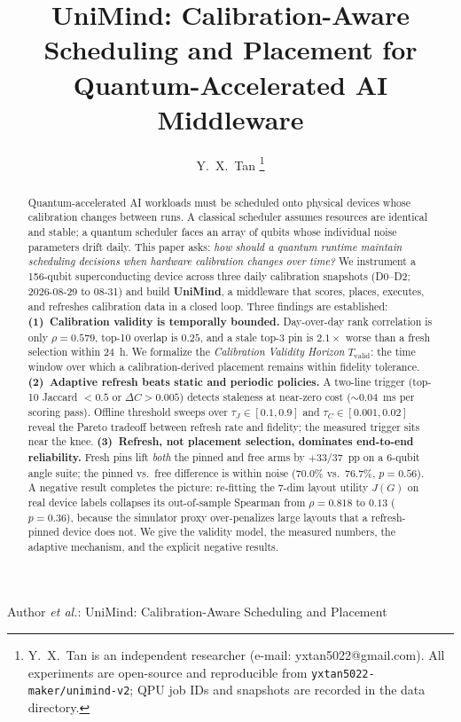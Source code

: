 \documentclass[journal,10pt,twocolumn]{IEEEtran}
\begin{document}
\title{UniMind: Calibration-Aware Scheduling and Placement for Quantum-Accelerated AI Middleware}

\author{Y.~X.~Tan%
\thanks{Y.~X.~Tan is an independent researcher (e-mail: yxtan5022@gmail.com). All experiments are open-source and
reproducible from \texttt{yxtan5022-maker/unimind-v2}; QPU job IDs and snapshots are recorded in the data directory.}}

%
{Author \MakeLowercase{\textit{et al.}}: UniMind: Calibration-Aware Scheduling and Placement}

\maketitle

\begin{abstract}
Quantum-accelerated AI workloads must be scheduled onto physical devices whose calibration changes
between runs. A classical scheduler assumes resources are identical and stable; a quantum scheduler
faces an array of qubits whose individual noise parameters drift daily. This paper asks:
\emph{how should a quantum runtime maintain scheduling decisions when hardware calibration changes
over time?} We instrument a 156-qubit superconducting device across three daily calibration
snapshots (D0--D2; 2026-08-29 to 08-31) and build \textbf{UniMind}, a middleware that scores,
places, executes, and refreshes calibration data in a closed loop. Three findings are established:
\textbf{(1)~Calibration validity is temporally bounded.} Day-over-day rank correlation is only
$\rho{=}0.579$, top-10 overlap is $0.25$, and a stale top-3 pin is $2.1\times$ worse than a fresh
selection within 24~h. We formalize the \emph{Calibration Validity Horizon}
$T_{\mathrm{valid}}$: the time window over which a calibration-derived placement remains within
fidelity tolerance. \textbf{(2)~Adaptive refresh beats static and periodic policies.} A two-line
trigger (top-10 Jaccard $<0.5$ or $\Delta C{>}0.005$) detects staleness at near-zero cost
($\sim0.04$~ms per scoring pass). Offline threshold sweeps over $\tau_J{\in}[0.1,0.9]$ and
$\tau_C{\in}[0.001,0.02]$ reveal the Pareto tradeoff between refresh rate and fidelity;
the measured trigger sits near the knee. \textbf{(3)~Refresh, not placement selection, dominates
end-to-end reliability.} Fresh pins lift \emph{both} the pinned and free arms by $+33/37$~pp on a
6-qubit angle suite; the pinned vs.\ free difference is within noise ($70.0\%$ vs.\ $76.7\%$,
$p{=}0.56$). A negative result completes the picture: re-fitting the 7-dim layout utility $J(G)$
on real device labels collapses its out-of-sample Spearman from $\rho{=}0.818$ to $0.13$
($p{=}0.36$), because the simulator proxy over-penalizes large layouts that a refresh-pinned
device does not. We give the validity model, the measured numbers, the adaptive mechanism, and
the explicit negative results.
\end{abstract}
\end{document}
